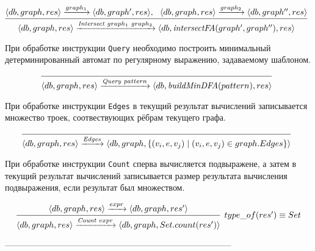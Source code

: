 $$
\infer[]{\langle db, graph, res\rangle \xrightarrow{\textit{Intersect} \ graph_1 \ graph_2} \langle db, \textit{intersectFA}(graph', graph''), res\rangle}{\langle db, graph,res\rangle \xrightarrow{graph_1} \langle db, graph', res \rangle, \ \ \langle db, graph,res \rangle \xrightarrow{graph_2} \langle db, graph'', res \rangle}
$$


При обработке инструкции \verb|Query| необходимо построить минимальный детерминированный автомат по регулярному выражению, задаваемому шаблоном.

$$
\infer[]{\langle db, graph, res \rangle \xrightarrow{\textit{Query} \ pattern} \langle db, \textit{buildMinDFA}(pattern), res \rangle}{}
$$

При обработке инструкции \verb|Edges| в текущий результат вычислений записывается множество троек, соотвествующих рёбрам текущего графа.

$$
\infer[]{\langle db, graph, res \rangle \xrightarrow{\textit{Edges}} \langle db, graph, \{(v_i,e,v_j) \mid (v_i,e,v_j) \in graph.Edges\}\rangle}{}
$$

При обработке инструкции \verb|Count| сперва вычисляется подвыражене, а затем в текущий результат вычислений записывается размер результата вычисления подвыражения, если результат был множеством.

$$
\infer[type\_of(res') \equiv Set ]{\langle db, graph, res \rangle \xrightarrow{\textit{Count} \ expr} \langle db, graph, Set.count(res') \rangle}{\langle db, graph, res \rangle \xrightarrow{expr} \langle db, graph, res' \rangle}
$$

--------------------------------------------------------------------------------
%




